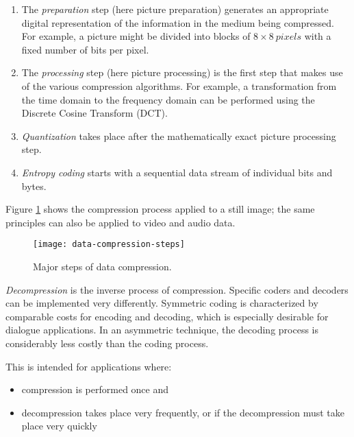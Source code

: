 \begin{enumerate}
	\item The \textit{preparation} step (here picture preparation) generates an appropriate digital	representation of the information in the medium being compressed. For example, a picture might be divided into blocks of $ 8 \times 8 \:pixels $ with a fixed number of bits per pixel.
	
	\item The \textit{processing} step (here picture processing) is the first step that makes use of the various compression algorithms. For example, a transformation from the time domain to the frequency domain can be performed using the Discrete Cosine Transform (DCT).
	
	\item \textit{Quantization} takes place after the mathematically exact picture processing step.
	
	\item \textit{Entropy coding} starts with a sequential data stream of individual bits and bytes.
\end{enumerate}


Figure {\ref{fig:data-compression-steps}} shows the compression process applied to a still image; the same principles can also be applied to video and audio data.

\begin{figure}[hb!]
	\centering
	\texttt{[image: data-compression-steps]}
	\caption{Major steps of data compression.}{\label{fig:data-compression-steps}}
\end{figure}

\textit{Decompression} is the inverse process of compression. Specific coders and decoders can be implemented very differently. Symmetric coding is characterized by comparable costs for encoding and decoding, which is especially desirable for dialogue applications. In an asymmetric technique, the decoding process is considerably less costly than the coding process. 

This is intended for applications where:
\begin{itemize}
	\item compression is performed once and 
	\item decompression takes place very frequently, or if the decompression must take place very quickly
\end{itemize}

